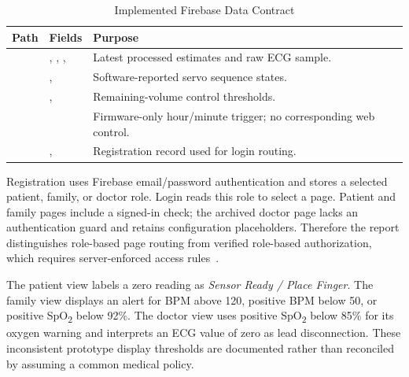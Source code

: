 \begin{table}[!t]
\caption{Implemented Firebase Data Contract}\label{tab:schema}
\centering\footnotesize
\begin{tabularx}{\columnwidth}{@{}P{0.20\columnwidth}YY@{}}
\toprule
Path & Fields & Purpose \\
\midrule
{} & , , ,  & Latest processed estimates and raw ECG sample. \\
 & ,  & Software-reported servo sequence states. \\
 & ,  & Remaining-volume control thresholds. \\
 &  & Firmware-only hour/minute trigger; no corresponding web control. \\
 & ,  & Registration record used for login routing. \\
\bottomrule
\end{tabularx}
\end{table}

Registration uses Firebase email/password authentication and stores a selected patient, family, or doctor role. Login reads this role to select a page. Patient and family pages include a signed-in check; the archived doctor page lacks an authentication guard and retains configuration placeholders. Therefore the report distinguishes role-based page routing from verified role-based authorization, which requires server-enforced access rules~\cite{firebaserules}.

The patient view labels a zero reading as \emph{Sensor Ready / Place Finger}. The family view displays an alert for BPM above 120, positive BPM below 50, or positive SpO\textsubscript{2} below 92\%. The doctor view uses positive SpO\textsubscript{2} below 85\% for its oxygen warning and interprets an ECG value of zero as lead disconnection. These inconsistent prototype display thresholds are documented rather than reconciled by assuming a common medical policy.

